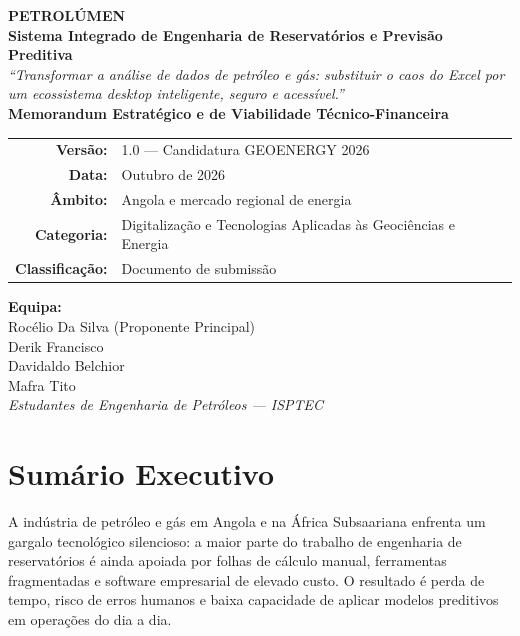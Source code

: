 \documentclass[11pt,a4paper]{article}
\begin{document}
\begin{titlepage}
    \centering
    \vspace*{1.8cm}

    {\Huge\textbf{\color{petrolblue} PETROLÚMEN}}\\[0.5cm]
    {\Large\textbf{Sistema Integrado de Engenharia de Reservatórios e Previsão Preditiva}}\\[1.3cm]

    {\large\textit{“Transformar a análise de dados de petróleo e gás: substituir o caos do Excel por um ecossistema desktop inteligente, seguro e acessível.”}}\\[2.4cm]

    {\Large\textbf{Memorandum Estratégico e de Viabilidade Técnico-Financeira}}\\[1.8cm]

    \begin{tabular}{rl}
        \textbf{Versão:} & 1.0 — Candidatura GEOENERGY 2026 \\
        \textbf{Data:} & Outubro de 2026 \\
        \textbf{Âmbito:} & Angola e mercado regional de energia \\
        \textbf{Categoria:} & Digitalização e Tecnologias Aplicadas às Geociências e Energia \\
        \textbf{Classificação:} & Documento de submissão \\
    \end{tabular}

    \vfill

    {\large\textbf{Equipa:}}\\
    Rocélio Da Silva (Proponente Principal)\\
    Derik Francisco\\
    Davidaldo Belchior\\
    Mafra Tito\\
    \textit{Estudantes de Engenharia de Petróleos — ISPTEC}

    \vspace{1cm}
\end{titlepage}

\tableofcontents
\newpage

\section{Sumário Executivo}
A indústria de petróleo e gás em Angola e na África Subsaariana enfrenta um gargalo tecnológico silencioso: a maior parte do trabalho de engenharia de reservatórios é ainda apoiada por folhas de cálculo manual, ferramentas fragmentadas e software empresarial de elevado custo. O resultado é perda de tempo, risco de erros humanos e baixa capacidade de aplicar modelos preditivos em operações do dia a dia.
\end{document}
